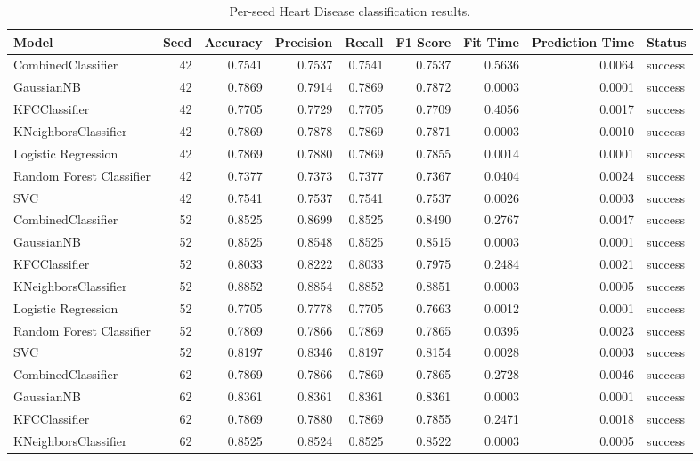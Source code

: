 \begin{table}
\caption{Per-seed Heart Disease classification results.}
\label{tab:heart_per_seed_results}
\begin{tabular}{lrrrrrrrl}
\toprule
Model & Seed & Accuracy & Precision & Recall & F1 Score & Fit Time & Prediction Time & Status \\
\midrule
CombinedClassifier & 42 & 0.7541 & 0.7537 & 0.7541 & 0.7537 & 0.5636 & 0.0064 & success \\
GaussianNB & 42 & 0.7869 & 0.7914 & 0.7869 & 0.7872 & 0.0003 & 0.0001 & success \\
KFCClassifier & 42 & 0.7705 & 0.7729 & 0.7705 & 0.7709 & 0.4056 & 0.0017 & success \\
KNeighborsClassifier & 42 & 0.7869 & 0.7878 & 0.7869 & 0.7871 & 0.0003 & 0.0010 & success \\
Logistic Regression & 42 & 0.7869 & 0.7880 & 0.7869 & 0.7855 & 0.0014 & 0.0001 & success \\
Random Forest Classifier & 42 & 0.7377 & 0.7373 & 0.7377 & 0.7367 & 0.0404 & 0.0024 & success \\
SVC & 42 & 0.7541 & 0.7537 & 0.7541 & 0.7537 & 0.0026 & 0.0003 & success \\
CombinedClassifier & 52 & 0.8525 & 0.8699 & 0.8525 & 0.8490 & 0.2767 & 0.0047 & success \\
GaussianNB & 52 & 0.8525 & 0.8548 & 0.8525 & 0.8515 & 0.0003 & 0.0001 & success \\
KFCClassifier & 52 & 0.8033 & 0.8222 & 0.8033 & 0.7975 & 0.2484 & 0.0021 & success \\
KNeighborsClassifier & 52 & 0.8852 & 0.8854 & 0.8852 & 0.8851 & 0.0003 & 0.0005 & success \\
Logistic Regression & 52 & 0.7705 & 0.7778 & 0.7705 & 0.7663 & 0.0012 & 0.0001 & success \\
Random Forest Classifier & 52 & 0.7869 & 0.7866 & 0.7869 & 0.7865 & 0.0395 & 0.0023 & success \\
SVC & 52 & 0.8197 & 0.8346 & 0.8197 & 0.8154 & 0.0028 & 0.0003 & success \\
CombinedClassifier & 62 & 0.7869 & 0.7866 & 0.7869 & 0.7865 & 0.2728 & 0.0046 & success \\
GaussianNB & 62 & 0.8361 & 0.8361 & 0.8361 & 0.8361 & 0.0003 & 0.0001 & success \\
KFCClassifier & 62 & 0.7869 & 0.7880 & 0.7869 & 0.7855 & 0.2471 & 0.0018 & success \\
KNeighborsClassifier & 62 & 0.8525 & 0.8524 & 0.8525 & 0.8522 & 0.0003 & 0.0005 & success \\

\end{tabular}
\end{table}

